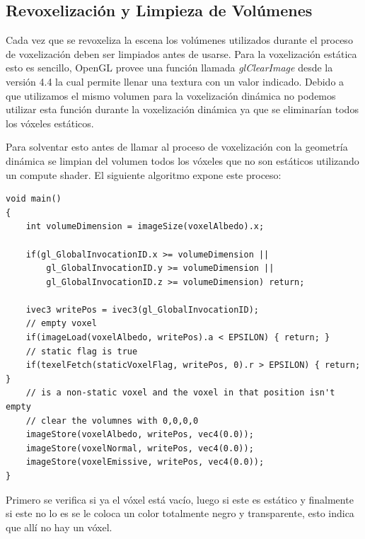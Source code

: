 \subsection{Revoxelización y Limpieza de Volúmenes}
Cada vez que se revoxeliza la escena los volúmenes utilizados durante el proceso de voxelización deben ser limpiados antes de usarse. Para la voxelización estática esto es sencillo, OpenGL provee una función llamada \emph{glClearImage} desde la versión 4.4 la cual permite llenar una textura con un valor indicado. Debido a que utilizamos el mismo volumen para la voxelización dinámica no podemos utilizar esta función durante la voxelización dinámica ya que se eliminarían todos los vóxeles estáticos.

Para solventar esto antes de llamar al proceso de voxelización con la geometría dinámica se limpian del volumen todos los vóxeles que no son estáticos utilizando un compute shader. El siguiente algoritmo expone este proceso:
\\
\begin{lstlisting}[caption={Limpieza de vóxeles no estáticos.}, label=ClearVoxels]
void main()
{
    int volumeDimension = imageSize(voxelAlbedo).x;

	if(gl_GlobalInvocationID.x >= volumeDimension ||
		gl_GlobalInvocationID.y >= volumeDimension ||
		gl_GlobalInvocationID.z >= volumeDimension) return;

    ivec3 writePos = ivec3(gl_GlobalInvocationID);
    // empty voxel
    if(imageLoad(voxelAlbedo, writePos).a < EPSILON) { return; }
    // static flag is true
    if(texelFetch(staticVoxelFlag, writePos, 0).r > EPSILON) { return; }
    // is a non-static voxel and the voxel in that position isn't empty
    // clear the volumnes with 0,0,0,0
    imageStore(voxelAlbedo, writePos, vec4(0.0));
    imageStore(voxelNormal, writePos, vec4(0.0));
    imageStore(voxelEmissive, writePos, vec4(0.0));
}
\end{lstlisting}
Primero se verifica si ya el vóxel está vacío, luego si este es estático y finalmente si este no lo es se le coloca un color totalmente negro y transparente, esto indica que allí no hay un vóxel.
